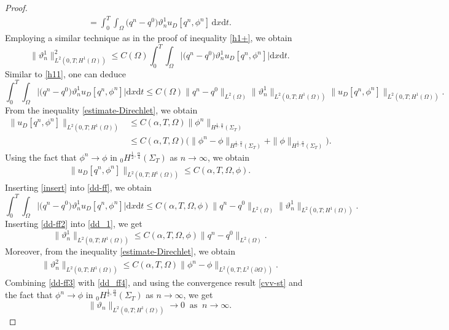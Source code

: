 \documentclass[a4paper,12pt,reqno,natbib]{amsart}
\newcommand{\dx} {\displaystyle\mathrm{d}x}
\newcommand{\dt} {\displaystyle\mathrm{d}t}
\begin{document}
{\begin{proof}
\begin{align*}
    = \int_0^T \int_\Omega \Big(q^n - q^0\Big) \vartheta_n^1 u_D[q^n, \phi^n] \, \dx \dt.
\end{align*}
Employing a similar technique as in the proof of inequality \eqref{h1+}, we obtain
\begin{equation} \label{dd_1}
    \|\vartheta_n^1\|_{L^2(0, T; H^1(\Omega))}^2 \leq C(\Omega) \int_0^T \int_\Omega \Big|\Big(q^n - q^0\Big) \vartheta_n^1 u_D[q^n, \phi^n]\Big| \dx \dt.
\end{equation}
Similar to \eqref{h11}, one can deduce
\begin{equation}\label{dd-ff}
    \int_0^T \int_\Omega \Big|\Big(q^n - q^0\Big) \vartheta_n^1 u_D[q^n, \phi^n]\Big| \dx \dt \leq C(\Omega) \|q^n - q^0\|_{L^2(\Omega)} \|\vartheta_n^1\|_{L^2(0, T; H^1(\Omega))} \| u_D[q^n, \phi^n] \|_{L^2(0, T; H^1(\Omega))}.
\end{equation}
From the inequality \eqref{estimate-Direchlet}, we obtain
\begin{align*}
    \| u_D[q^n, \phi^n] \|_{L^2(0, T; H^1(\Omega))} &\leq C(\alpha, T, \Omega) \|\phi^n\|_{H^{\frac{1}{2}, \frac{\alpha}{4}} (\Sigma_T)} \\
    &\leq C(\alpha, T, \Omega) \Big(\|\phi^n - \phi\|_{H^{\frac{1}{2}, \frac{\alpha}{4}} (\Sigma_T)} + \|\phi\|_{H^{\frac{1}{2}, \frac{\alpha}{4}} (\Sigma_T)}\Big).
\end{align*}
Using the fact that \(\phi^n \to \phi\) in \({}_0 H^{\frac{1}{2}, \frac{\alpha}{4}} (\Sigma_T)\) as \(n \to \infty\), we obtain
\begin{align}\label{insert}
    \| u_D[q^n, \phi^n] \|_{L^2(0, T; H^1(\Omega))} \leq C(\alpha, T, \Omega, \phi).
\end{align}
Inserting \eqref{insert} into \eqref{dd-ff}, we obtain
\begin{equation}\label{dd-ff2}
    \int_0^T \int_\Omega \Big|\Big(q^n - q^0\Big) \vartheta_n^1 u_D[q^n, \phi^n]\Big| \dx \dt \leq C(\alpha, T, \Omega, \phi) \|q^n - q^0\|_{L^2(\Omega)} \|\vartheta_n^1\|_{L^2(0, T; H^1(\Omega))}.
\end{equation}
Inserting \eqref{dd-ff2} into \eqref{dd_1}, we get
\begin{equation}\label{dd-ff3}
    \|\vartheta_n^1\|_{L^2(0, T; H^1(\Omega))} \leq C(\alpha, T, \Omega,\phi) \|q^n - q^0\|_{L^2(\Omega)}.
\end{equation}
Moreover, from the inequality \eqref{estimate-Direchlet}, we obtain
\begin{align} \label{dd_ff4}
    \|\vartheta_n^2\|_{L^2(0, T; H^1(\Omega))} \leq C(\alpha, T, \Omega) \|\phi^n - \phi\|_{L^2(0, T; L^2(\partial\Omega))}.
\end{align}
Combining \eqref{dd-ff3} with \eqref{dd_ff4}, and using the convergence result \eqref{cvv-st} and the fact that $\phi^n \longrightarrow \phi$ in ${}_0 H^{\frac{1}{2}, \frac{\alpha}{4}} (\Sigma_T)$ as $n \longrightarrow \infty$, we get
\begin{equation*}
    \|\vartheta_n\|_{L^2(0, T; H^1(\Omega))} \longrightarrow 0 \;\; \text{as} \;\; n \longrightarrow \infty.
\end{equation*}


\end{proof}}
\end{document}
